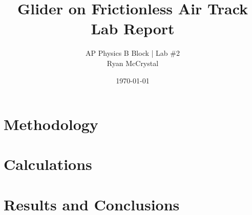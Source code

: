 \documentclass[12pt]{article}
\title{Glider on Frictionless Air Track Lab Report}
\author{AP Physics B Block | Lab \#2\\Ryan McCrystal}
\date{\today}
\begin{document}
\maketitle
\newpage

\begin{abstract}
\end{abstract}

\section{Methodology}
\newpage

\section{Calculations}
\newpage

\section{Results and Conclusions}
\newpage
\end{document}
